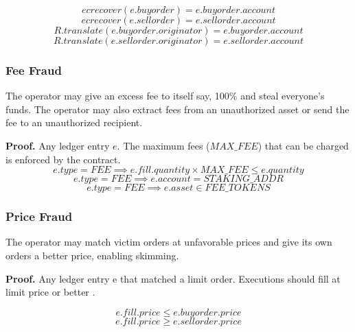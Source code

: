 \documentclass[12pt,a4paper]{article}
\begin{document}
\begin{equation}ecrecover(e.buyorder) = e.buyorder.account\end{equation}
\begin{equation}
ecrecover(e.sellorder) = e.sellorder.account
\end{equation}
\begin{equation}
    R.translate(e.buyorder.originator) = e.buyorder.account
\end{equation}
\begin{equation}
    R.translate(e.sellorder.originator) = e.sellorder.account
\end{equation}

\subsubsection{Fee Fraud} \label{fp:fee}
The operator may give an excess fee to itself say, 100\% and steal everyone’s funds. The operator may also extract fees from an unauthorized asset or send the fee to an unauthorized recipient.

\textbf{Proof.}
Any ledger entry $e$. The maximum fees ($MAX\_FEE$) that can be charged is enforced by the contract.
\begin{equation}
    e.type = FEE \implies e.fill.quantity \times MAX\_FEE \leq e.quantity
\end{equation}
\begin{equation}
    e.type = FEE \implies e.account = STAKING\_ADDR
\end{equation}
\begin{equation}
    e.type = FEE \implies e.asset \in FEE\_TOKENS
\end{equation}

\subsubsection{Price Fraud} \label{fp:prc}
The operator may match victim orders at unfavorable prices and give its own orders a better price, enabling skimming.

\textbf{Proof.} Any ledger entry e that matched a limit order. Executions should fill at limit price or better .

\begin{equation}
    e.fill.price \leq e.buyorder.price
\end{equation}
\begin{equation}
    e.fill.price \geq e.sellorder.price
\end{equation}
\end{document}
